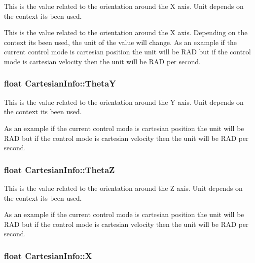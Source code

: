This is the value related to the orientation around the X axis. Unit depends on the context it\textquotesingle{}s been used. 

This is the value related to the orientation around the X axis. Depending on the context it\textquotesingle{}s been used, the unit of the value will change. As an example if the current control mode is cartesian position the unit will be R\+AD but if the control mode is cartesian velocity then the unit will be R\+AD per second. 
\subsubsection[{\texorpdfstring{ThetaY}{ThetaY}}]{\setlength{\rightskip}{0pt plus 5cm}float Cartesian\+Info\+::\+ThetaY}\hypertarget{structCartesianInfo_a4aef5897f4cdcf7ecc9df6804f844d46}{}\label{structCartesianInfo_a4aef5897f4cdcf7ecc9df6804f844d46}


This is the value related to the orientation around the Y axis. Unit depends on the context it\textquotesingle{}s been used. 

As an example if the current control mode is cartesian position the unit will be R\+AD but if the control mode is cartesian velocity then the unit will be R\+AD per second. 
\subsubsection[{\texorpdfstring{ThetaZ}{ThetaZ}}]{\setlength{\rightskip}{0pt plus 5cm}float Cartesian\+Info\+::\+ThetaZ}\hypertarget{structCartesianInfo_a2890c501f3b7b9479e12ad51f04f0a7f}{}\label{structCartesianInfo_a2890c501f3b7b9479e12ad51f04f0a7f}


This is the value related to the orientation around the Z axis. Unit depends on the context it\textquotesingle{}s been used. 

As an example if the current control mode is cartesian position the unit will be R\+AD but if the control mode is cartesian velocity then the unit will be R\+AD per second. 
\subsubsection[{\texorpdfstring{X}{X}}]{\setlength{\rightskip}{0pt plus 5cm}float Cartesian\+Info\+::X}\hypertarget{structCartesianInfo_a212cc2dcae1697132fc31fa2f5d17269}{}\label{structCartesianInfo_a212cc2dcae1697132fc31fa2f5d17269}


